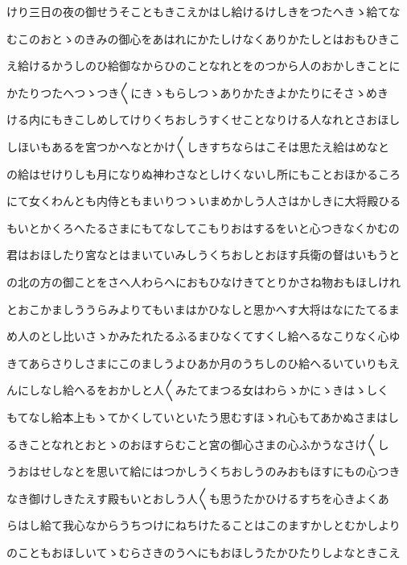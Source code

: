 \documentclass[a4paper,11pt,landscape]{ltjtarticle}
\begin{document}
\par\medskip
けり三日の夜の御せうそこともきこえかはし給けるけしきをつたへきゝ給てな
\par\medskip
むこのおとゝのきみの御心をあはれにかたしけなくありかたしとはおもひきこ
\par\medskip
え給けるかうしのひ給御なからひのことなれとをのつから人のおかしきことに
\par\medskip
かたりつたへつゝつき〱にきゝもらしつゝありかたきよかたりにそさゝめき
\par\medskip
ける内にもきこしめしてけりくちおしうすくせことなりける人なれとさおほし
\par\medskip
しほいもあるを宮つかへなとかけ〱しきすちならはこそは思たえ給はめなと
\par\medskip
の給はせけりしも月になりぬ神わさなとしけくないし所にもことおほかるころ
\par\medskip
にて女くわんとも内侍ともまいりつゝいまめかしう人さはかしきに大将殿ひる
\par\medskip
もいとかくろへたるさまにもてなしてこもりおはするをいと心つきなくかむの
\par\medskip
君はおほしたり宮なとはまいていみしうくちおしとおほす兵衛の督はいもうと
\par\medskip
の北の方の御ことをさへ人わらへにおもひなけきてとりかさね物おもほしけれ
\par\medskip
とおこかましううらみよりてもいまはかひなしと思かへす大将はなにたてるま
\par\medskip
め人のとし比いさゝかみたれたるふるまひなくてすくし給へるなこりなく心ゆ
\par\medskip
きてあらさりしさまにこのましうよひあか月のうちしのひ給へるいていりもえ
\par\medskip
んにしなし給へるをおかしと人〱みたてまつる女はわらゝかにゝきはゝしく
\par\medskip
もてなし給本上もゝてかくしていといたう思むすほゝれ心もてあかぬさまはし
\par\medskip
るきことなれとおとゝのおほすらむこと宮の御心さまの心ふかうなさけ〱し
\par\medskip
うおはせしなとを思いて給にはつかしうくちおしうのみおもほすにもの心つき
\par\medskip
なき御けしきたえす殿もいとおしう人〱も思うたかひけるすちを心きよくあ
\par\medskip
らはし給て我心なからうちつけにねちけたることはこのますかしとむかしより
\par\medskip
のこともおほしいてゝむらさきのうへにもおほしうたかひたりしよなときこえ
\par\medskip
\end{document}
